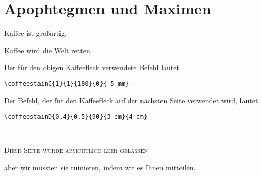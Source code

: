\documentclass[a4paper, 11pt, BCOR = 0 pt, oneside]{scrartcl}
\begin{document}
\section{Apophtegmen und Maximen}

Kaffee ist großartig.

\vspace{5mm}

\noindent
Kaffee wird die Welt retten.

\vfill{}

\begin{tcolorbox}
Der für den obigen Kaffeefleck verwendete Befehl lautet

  \verb|\coffeestainC{1}{1}{180}{0}{-5 mm}|
\end{tcolorbox}

\begin{tcolorbox}
Der Befehl, der für den Kaffeefleck auf der nächsten Seite verwendet wird, lautet

  \verb|\coffeestainD{0.4}{0.5}{90}{3 cm}{4 cm}|
\end{tcolorbox}

\newpage{}
\pagestyle{empty}
~\\

\label{stainD}

\vfill{}
\begin{center}
\textsc{Diese Seite wurde absichtlich leer gelassen}

aber wir mussten sie ruinieren, indem wir es Ihnen mitteilen.
\end{center}

\vfill{}
\end{document}
